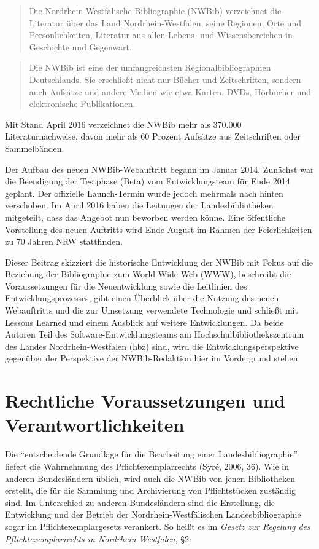 \documentclass[a4paper,
fontsize=11pt,
oneside,
numbers=noperiodatend,
parskip=half-,
bibliography=totoc,
final
]{scrartcl}
\begin{document}
\begin{quote}
Die Nordrhein-Westfälische Bibliographie (NWBib) verzeichnet die
Literatur über das Land Nordrhein-West\-falen, seine Regionen, Orte und
Persönlichkeiten, Literatur aus allen Lebens- und Wissensbereichen in
Geschichte und Gegenwart.
\end{quote}

\begin{quote}
Die NWBib ist eine der umfangreichsten Regionalbibliographien
Deutschlands. Sie erschließt nicht nur Bücher und Zeitschriften, sondern
auch Aufsätze und andere Medien wie etwa Karten, DVDs, Hörbücher und
elektronische Publikationen.
\end{quote}

Mit Stand April 2016 verzeichnet die NWBib mehr als 370.000
Literaturnachweise, davon mehr als 60 Prozent Aufsätze aus Zeitschriften
oder Sammelbänden.

Der Aufbau des neuen NWBib-Webauftritt begann im Januar 2014. Zunächst
war die Beendigung der Testphase (Beta) vom Entwicklungsteam für Ende
2014 geplant. Der offizielle Launch-Termin wurde jedoch mehrmals nach
hinten verschoben. Im April 2016 haben die Leitungen der
Landesbibliotheken mitgeteilt, dass das Angebot nun beworben werden
könne. Eine öffentliche Vorstellung des neuen Auftritts wird Ende August
im Rahmen der Feierlichkeiten zu 70 Jahren NRW stattfinden.

Dieser Beitrag skizziert die historische Entwicklung der NWBib mit Fokus
auf die Beziehung der Bibliographie zum World Wide Web (WWW), beschreibt
die Voraussetzungen für die Neuentwicklung sowie die Leitlinien des
Entwicklungsprozesses, gibt einen Überblick über die Nutzung des neuen
Webauftritts und die zur Umsetzung verwendete Technologie und schließt
mit Lessons Learned und einem Ausblick auf weitere Entwicklungen. Da
beide Autoren Teil des Software-Entwicklungsteams am
Hochschulbibliothekszentrum des Landes Nordrhein-West\-falen (hbz) sind,
wird die Entwicklungsperspektive gegenüber der Perspektive der
NWBib-Redaktion hier im Vordergrund stehen.

\section*{Rechtliche Voraussetzungen und
Verantwortlichkeiten}\label{rechtliche-voraussetzungen-und-verantwortlichkeiten}

Die \enquote{entscheidende Grundlage für die Bearbeitung einer
Landesbibliographie} liefert die Wahrnehmung des Pflichtexemplarrechts
(Syré, 2006, 36). Wie in anderen Bundesländern üblich, wird auch die
NWBib von jenen Bibliotheken erstellt, die für die Sammlung und
Archivierung von Pflichtstücken zuständig sind. Im Unterschied zu
anderen Bundesländern sind die Erstellung, die Entwicklung und der
Betrieb der Nordrhein-Westfälischen Landesbibliographie sogar im
Pflichtexemplargesetz verankert. So heißt es im \emph{Gesetz zur
Regelung des Pflichtexemplarrechts in Nordrhein-West\-falen}, §2:
\end{document}
